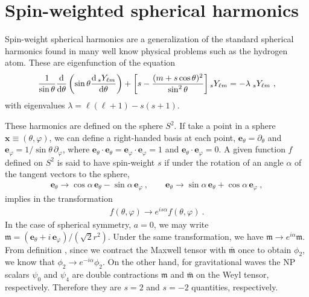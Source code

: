 
\chapter{Spin-weighted spherical harmonics}
\label{AppendixSWHs}

Spin-weight spherical harmonics are a generalization of the standard spherical harmonics
found in many well know physical problems such as the hydrogen atom.
These are eigenfunction of the equation
\begin{equation}
	\label{eqA:diffSWSH}
	\frac{1}{\sin\theta} \frac{\dd}{\dd\theta} \left( \sin\theta 
	\frac{\dd \,\uu[s]{Y}{\ell m}}{\dd \theta} \right)
    + \left[ s - \frac{(m + s \cos\theta)^2}{\sin^2\theta} \right] \uu[s]{Y}{\ell m} = - \lambda \;\uu[s]{Y}{\ell m}~,
\end{equation}
with eigenvalues $\lambda= \ell(\ell +1) - s(s+1)$.

These harmonics are defined on the sphere $S^2$. If take a point in a sphere $\bm{x}\equiv(\theta,\varphi)$, we can define a right-handed basis at each point, $\bm{e}_\theta = \partial_\theta$ and $\bm{e}_\varphi = 1/\sin\theta \,\partial_\varphi$, where $\bm{e}_\theta \cdot \bm{e}_\theta = \bm{e}_\varphi \cdot \bm{e}_\varphi = 1$ and $\bm{e}_\theta \cdot \bm{e}_\varphi = 0$.
A given function $f$ defined on $S^2$ is said to have spin-weight $s$ if under the rotation of an angle $\alpha$ of the tangent vectors to the sphere,
\begin{align}
		\bm{e}_\theta \to \cos\alpha \,\bm{e}_\theta - \sin\alpha \,\bm{e}_\varphi ~, \qquad \bm{e}_\theta \to \sin\alpha \,\bm{e}_\theta + \cos\alpha \,\bm{e}_\varphi ~,
\end{align}
implies in the transformation
\begin{align}
	f(\theta, \varphi) \to e^{i s \alpha} f(\theta, \varphi) ~.
\end{align}
In the case of spherical symmetry, $a=0$, we may write $\bm{\mathfrak{m}} = (\bm{e}_\theta + i \,\bm{e}_\varphi)/(\sqrt{2} r^2)$. Under the same transformation, we have $\bm{\mathfrak{m}}\to e^{i\alpha} \bm{\mathfrak{m}}$. From definition , since we contract the Maxwell tensor with $\bm{\bar{\mathfrak{m}}}$ once to obtain $\phi_2$, we know that $\phi_2 \to e^{-i \alpha} \phi_2$. On the other hand, for gravitational waves the NP scalars $\psi_0$ and $\psi_4$ are double contractions $\bm{\mathfrak{m}}$ and $\bm{\bar{\mathfrak{m}}}$ on the Weyl tensor, respectively. Therefore they are $s=2$ and $s=-2$ quantities, respectively.

